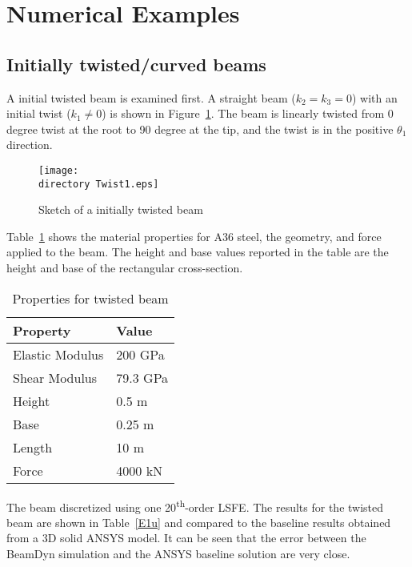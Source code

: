 \documentclass{aiaa-tc}
\def\directory{EPSF/}
\begin{document}
\section{Numerical Examples}

\subsection{Initially twisted/curved beams}

A initial twisted beam is examined first. A straight beam ($k_2=k_3=0$) with an initial twist ($k_1\neq 0$) is shown in Figure~\ref{Twist1}. The beam is linearly twisted from 0 degree twist at the root to 90 degree at the tip, and the twist is in the positive $\theta_1$ direction.
\begin{figure}
\centering
\texttt{[image: \\directory Twist1.eps]}
\caption{Sketch of a initially twisted beam} 
\label{Twist1}
\end{figure}
 Table~\ref{E1Property} shows the material properties for A36 steel, the geometry, and force applied to the beam. The height and base values reported in the table are the height and base of the rectangular cross-section. 
 \begin{table}
\caption{\label{E1Property} Properties for twisted beam}
\begin{center}
    \begin{tabular}{| l | l |}
    	\hline
    	Property               & Value   \\ \hline
    	Elastic Modulus                      & 200 GPa \\ \hline
    	Shear Modulus                      & 79.3 GPa \\ \hline
    	Height                      & 0.5 m   \\ \hline
    	Base                      & 0.25 m  \\ \hline
    	Length                      & 10 m    \\ \hline
    	Force                      & 4000 kN \\ \hline
    \end{tabular}
\end{center}
\end{table}
The beam discretized using one 20\textsuperscript{th}-order LSFE. The results for the twisted beam are shown in Table~\ref{E1u} and compared to the baseline results obtained from a 3D solid ANSYS model. It can be seen that the error between the BeamDyn simulation and the ANSYS baseline solution are very close. 
\end{document}
